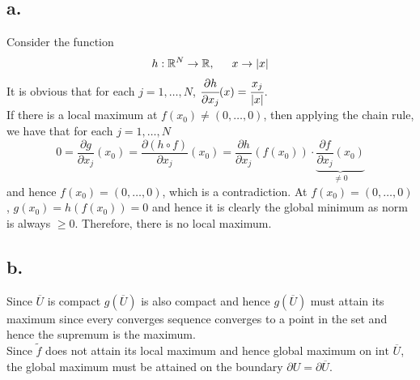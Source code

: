 \documentclass[11pt]{article}
\begin{document}
\subsection*{a.}
Consider the function 
\[
    h: \mathbb{R}^N \to \mathbb{R}, \indent x \to |x|    
\]
It is obvious that for each $j=1, \ldots ,N$, $\cfrac{\partial h}{\partial x_j}(x) = \cfrac{x_j}{|x|}$. \\
If there is a local maximum at $f(x_0) \ne (0,\ldots, 0)$, then applying the chain rule, we have that for each $j = 1, \ldots ,N$
\[
    0 = \frac{\partial g}{\partial x_j}(x_0) = 
    \frac{\partial (h \circ f)}{\partial x_j}(x_0) = \frac{\partial h}{\partial x_j}(f(x_0)) 
    \cdot \underbrace{\frac{\partial f}{\partial x_j}(x_0)}_{\ne 0}
\]
and hence $f(x_0) = (0,\ldots ,0)$, which is a contradiction. At $f(x_0) = (0,\ldots,0)$, 
$g(x_0)= h(f(x_0))=0$ and hence it is clearly the global minimum as norm is always $\ge 0$. Therefore, there is no local maximum.  
\subsection*{b.}
Since $\overline{U}$ is compact $g(\overline{U})$ is also compact and hence $g(\overline{U})$ must attain its maximum since every converges sequence converges to a point in the set and hence the supremum is the maximum. \\
Since $\tilde{f}$ does not attain its local maximum and hence global maximum on $\text{int}$ $\overline{U}$, 
the global maximum must be attained on the boundary $\partial U = \partial \overline{U}$.  
\end{document}
